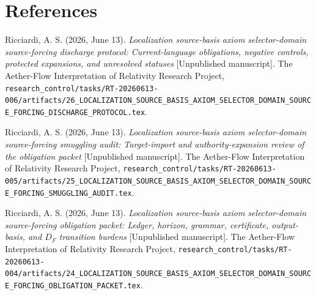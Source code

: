 \documentclass[11pt]{article}
\begin{document}
\section*{References}

Ricciardi, A. S. (2026, June 13). \emph{Localization source-basis axiom
selector-domain source-forcing discharge protocol: Current-language
obligations, negative controls, protected expansions, and unresolved
statuses} [Unpublished manuscript]. The Aether-Flow Interpretation of
Relativity Research Project,
\texttt{research\_control/tasks/RT-20260613-006/artifacts/26\_LOCALIZATION\_SOURCE\_BASIS\_AXIOM\_SELECTOR\_DOMAIN\_SOURCE\_FORCING\_DISCHARGE\_PROTOCOL.tex}.

Ricciardi, A. S. (2026, June 13). \emph{Localization source-basis axiom
selector-domain source-forcing smuggling audit: Target-import and
authority-expansion review of the obligation packet} [Unpublished
manuscript]. The Aether-Flow Interpretation of Relativity Research Project,
\texttt{research\_control/tasks/RT-20260613-005/artifacts/25\_LOCALIZATION\_SOURCE\_BASIS\_AXIOM\_SELECTOR\_DOMAIN\_SOURCE\_FORCING\_SMUGGLING\_AUDIT.tex}.

Ricciardi, A. S. (2026, June 13). \emph{Localization source-basis axiom
selector-domain source-forcing obligation packet: Ledger, horizon, grammar,
certificate, output-basis, and \(D_F\) transition burdens} [Unpublished
manuscript]. The Aether-Flow Interpretation of Relativity Research Project,
\texttt{research\_control/tasks/RT-20260613-004/artifacts/24\_LOCALIZATION\_SOURCE\_BASIS\_AXIOM\_SELECTOR\_DOMAIN\_SOURCE\_FORCING\_OBLIGATION\_PACKET.tex}.
\end{document}
